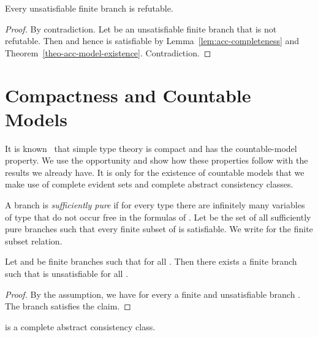 \begin{thm}[Completeness]
  \label{thm:completeness}
  Every unsatisfiable finite branch is refutable.
\end{thm}

\begin{proof}
  By contradiction.  Let  be an unsatisfiable finite
  branch that is not refutable.  Then  and
  hence  is satisfiable by
  Lemma~\ref{lem:acc-completeness} and
  Theorem~\ref{theo-acc-model-existence}.  Contradiction.
\end{proof}

\section{Compactness and Countable Models}

It is known~\cite{Henkin50,AndrewsBook} that
simple type theory is compact and has the
countable-model property.  We use the opportunity and
show how these properties follow with the results we
already have.  It is only for the existence of countable
models that we make use of complete evident sets and
complete abstract consistency classes.

A branch  is \emph{sufficiently pure} if for every
type  there are infinitely many variables of
type  that do not occur free in the formulas of .
Let  be the set of all sufficiently pure
branches  such that every finite subset of  is
satisfiable.  We write \emph{} for the
finite subset relation.

\begin{lem}
  \label{lem-aux-compactness}
  Let  and  be finite branches
  such that  for all
  .  Then there exists a finite
  branch  such that  is
  unsatisfiable for all .
\end{lem}

\begin{proof}
  By the assumption, we have for every  a finite and unsatisfiable branch .  The branch  satisfies the claim.
\end{proof}

\begin{lem}
  \label{lem:acc-compactness}
   is a complete abstract consistency
  class.
\end{lem}

